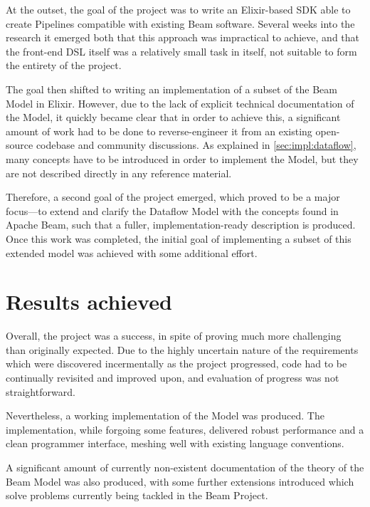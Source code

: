 At the outset, the goal of the project was to write an Elixir-based SDK able to create Pipelines compatible with existing Beam software.
Several weeks into the research it emerged both that this approach was impractical to achieve, and that the front-end DSL itself was a relatively small task in itself, not suitable to form the entirety of the project.

The goal then shifted to writing an implementation of a subset of the Beam Model in Elixir.
However, due to the lack of explicit technical documentation of the Model, it quickly became clear that in order to achieve this, a significant amount of work had to be done to reverse-engineer it from an existing open-source codebase and community discussions.
As explained in \cref{sec:impl:dataflow}, many concepts have to be introduced in order to implement the Model, but they are not described directly in any reference material.

Therefore, a second goal of the project emerged, which proved to be a major focus---to extend and clarify the Dataflow Model with the concepts found in Apache Beam, such that a fuller, implementation-ready description is produced.
Once this work was completed, the initial goal of implementing a subset of this extended model was achieved with some additional effort.

\section{Results achieved}\label{sec:intro:results}

Overall, the project was a success, in spite of proving much more challenging than originally expected.
Due to the highly uncertain nature of the requirements which were discovered incermentally as the project progressed, code had to be continually revisited and improved upon, and evaluation of progress was not straightforward.

Nevertheless, a working implementation of the Model was produced.
The implementation, while forgoing some features, delivered robust performance and a clean programmer interface, meshing well with existing language conventions.

A significant amount of currently non-existent documentation of the theory of the Beam Model was also produced, with some further extensions introduced which solve problems currently being tackled in the Beam Project.

